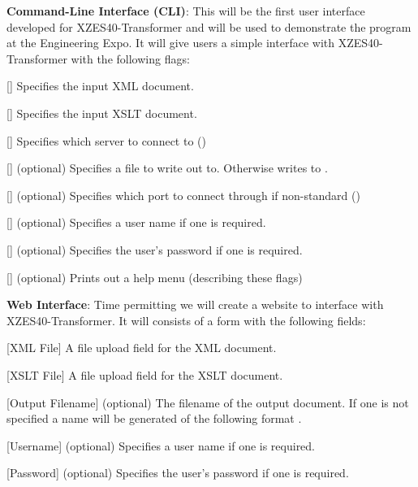 \begin{description}
  \item {
    \textbf{Command-Line Interface (CLI)}:
    This will be the first user interface developed for XZES40-Transformer and will be used to demonstrate the program at the Engineering Expo.
    It will give users a simple interface with XZES40-Transformer with the following flags:
    \begin{description}
      \item {
        []
        Specifies the input XML document.
      }
      \item {
        []
        Specifies the input XSLT document.
      }
      \item {
        []
        Specifies which server to connect to ()
      }
      \item {
        [] (optional)
        Specifies a file to write out to.  Otherwise writes to .
      }
      \item {
        [] (optional)
        Specifies which port to connect through if non-standard ()
      }
      \item {
        [] (optional)
        Specifies a user name if one is required.
      }
      \item {
        [] (optional)
        Specifies the user's password if one is required.
      }
      \item {
        [] (optional)
        Prints out a help menu (describing these flags)
      }
    \end{description}
  }
  \item {
    \textbf{Web Interface}:
    Time permitting we will create a website to interface with XZES40-Transformer.
    It will consists of a form with the following fields:
    \begin{description}
      \item {
        [XML File] A file upload field for the XML document.
      }
      \item {
        [XSLT File] A file upload field for the XSLT document.
      }
      \item {
        [Output Filename] (optional)
        The filename of the output document.
        If one is not specified a name will be generated of the following format .
      }
      \item {
        [Username] (optional)
        Specifies a user name if one is required.
      }
      \item {
        [Password] (optional)
        Specifies the user's password if one is required.
      }
    \end{description}
  }
\end{description}


